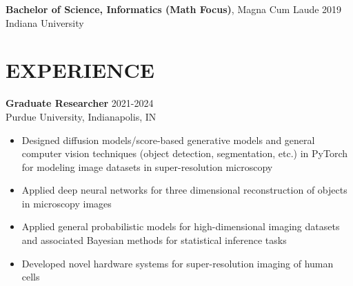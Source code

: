 \documentclass[margin, 10pt]{res} %
\begin{document}
\begin{resume}
\textbf{Bachelor of Science, Informatics (Math Focus)}, Magna Cum Laude \hfill 2019\\
Indiana University\\


 
\section{EXPERIENCE}

\textbf{Graduate Researcher} \hfill 2021-2024 \\
Purdue University, Indianapolis, IN

\begin{itemize} \itemsep -2pt %

\item Designed diffusion models/score-based generative models and general computer vision techniques (object detection, segmentation, etc.) in PyTorch for modeling image datasets in super-resolution microscopy


\item Applied deep neural networks for three dimensional reconstruction of objects in microscopy images



\item Applied general probabilistic models for high-dimensional imaging datasets and associated Bayesian methods for statistical inference tasks


\item Developed novel hardware systems for super-resolution imaging of human cells 

\end{itemize}


\end{resume}
\end{document}
